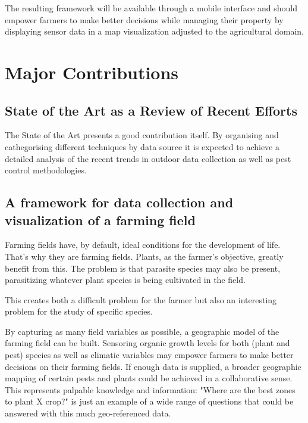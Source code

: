 The resulting framework will be available through a mobile interface and should empower farmers to make better decisions while managing their property by displaying sensor data in a map visualization adjusted to the agricultural domain. 


\section{Major Contributions} %
\label{sec:contributions}

\subsection{State of the Art as a Review of Recent Efforts}
\label{sec:review_recent_efforts}

The State of the Art presents a good contribution itself. By organising and cathegorising different techniques by data source it is expected to achieve a detailed analysis of the recent trends in outdoor data collection as well as pest control methodologies.

\subsection{A framework for data collection and visualization of a farming field}
\label{sec:digital_mapping_framework}

Farming fields have, by default, ideal conditions for the development of life. That's why they are farming fields. Plants, as the farmer's objective, greatly benefit from this. The problem is that parasite species may also be present, parasitizing whatever plant species is being cultivated in the field.

This creates both a difficult problem for the farmer but also an interesting problem for the study of specific species.

By capturing as many field variables as possible, a geographic model of the farming field can be built. Sensoring organic growth levels for both (plant and pest) species as well as climatic variables may empower farmers to make better decisions on their farming fields. If enough data is supplied, a broader geographic mapping of certain pests and plants could be achieved in a collaborative sense. This represents palpable knowledge and information: "Where are the best zones to plant X crop?" is just an example of a wide range of questions that could be answered with this much geo-referenced data.

